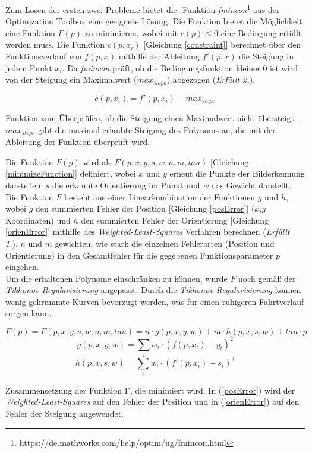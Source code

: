 Zum Lösen der ersten zwei Probleme bietet die \matlab -Funktion \textit{fmincon}\footnote{https://de.mathworks.com/help/optim/ug/fmincon.html} aus der Optimization Toolbox eine geeignete Lösung. Die Funktion bietet die Möglichkeit eine Funktion $F(p)$ zu minimieren, wobei mit $c(p) \leq 0$ eine Bedingung erfüllt werden muss. Die Funktion $c(p,x_i)$ [Gleichung \ref{constraint}] berechnet über den Funktionsverlauf von $f(p,x)$ mithilfe der Ableitung $f'(p,x)$ die Steigung in jedem Punkt $x_i$. Da \textit{fmincon} prüft, ob die Bedingungsfunktion kleiner 0 ist wird von der Steigung ein Maximalwert ($max_{slope}$) abgezogen (\textit{Erfüllt 2.}).\\
\begin{ownequation}[H]
\begin{equation}
c(p,x_i) = f'(p,x_i)-max_{slope}
\end{equation}
\caption[Funktion zum Überprüfen ob die Steigung einen Maximalwert nicht übersteigt.]{Funktion zum Überprüfen, ob die Steigung einen Maximalwert nicht übersteigt. $max_{slope}$ gibt die maximal erlaubte Steigung des Polynoms an, die mit der Ableitung der Funktion überprüft wird.}
\label{constraint}
\end{ownequation}
Die Funktion $F(p)$ wird als $F(p,x,y,s,w,n,m,tau)$ [Gleichung \ref{minimizeFunction}] definiert, wobei $x$ und $y$ erneut die Punkte der Bilderkennung darstellen, $s$ die erkannte Orientierung im Punkt und $w$ das Gewicht darstellt. Die Funktion $F$ besteht aus einer Linearkombination der Funktionen $g$ und $h$, wobei $g$ den summierten Fehler der Position [Gleichung \ref{posError}] ($x$,$y$ Koordinaten) und $h$ den summierten Fehler der Orientierung [Gleichung \ref{orienError}] mithilfe des \textit{Weighted-Least-Squares} Verfahren berechnen (\textit{Erfüllt 1.}). $n$ und $m$ gewichten, wie stark die einzelnen Fehlerarten (Position und Orientierung) in den Gesamtfehler für die gegebenen Funktionsparameter $p$ eingehen.\\
Um die erhaltenen Polynome einschränken zu können, wurde $F$ noch gemäß der \textit{Tikhonov Regularisierung} \cite{kaipio2006statistical} angepasst. Durch die \textit{Tikhonov-Regularisierung} können wenig gekrümmte Kurven bevorzugt werden, was für einen ruhigeren Fahrtverlauf sorgen kann.
\begin{ownequation}[H]
\begin{equation}
\label{minimizeFunction}
F(p) = F(p,x,y,s,w,n,m,tau) = n \cdot g(p,x,y,w) + m \cdot h(p,x,s,w) + tau \cdot p
\end{equation}
\begin{equation}
\label{posError}
g(p,x,y,w) = \sum_{i} w_i \cdot (f(p,x_i)-y_i)^2
\end{equation}
\begin{equation}
\label{orienError}
h(p,x,s,w) = \sum_{i} w_i \cdot (f'(p,x_i)-s_i)^2
\end{equation}
\caption[Definition der Funktion F, die im Schätzverfahren minimiert wird.]{Zusammensetzung der Funktion F, die minimiert wird. In (\ref{posError}) wird der \textit{Weighted-Least-Squares} auf den Fehler der Position und in (\ref{orienError}) auf den Fehler der Steigung angewendet.}
\label{F-function}
\end{ownequation}

